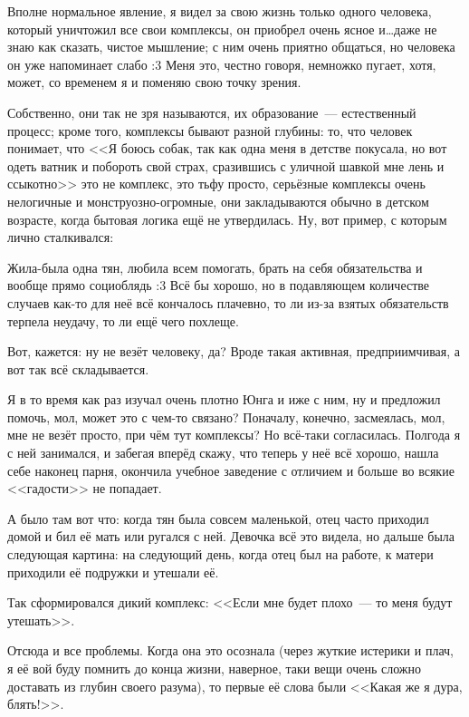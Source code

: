 \documentclass[a5paper,12pt,twoside]{memoir}
\begin{document}
\medskip

Вполне нормальное явление, я видел за свою жизнь только одного человека, который уничтожил все свои комплексы, он приобрел очень ясное и\ldots даже не знаю как сказать, чистое мышление; с ним очень приятно общаться, но человека он уже напоминает слабо :3 Меня это, честно говоря, немножко пугает, хотя, может, со временем я и поменяю свою точку зрения. 

Собственно, они так не зря называются, их образование~--- естественный процесс; кроме того, комплексы бывают разной глубины: то, что человек понимает, что <<Я боюсь собак, так как одна меня в детстве покусала, но вот одеть ватник и побороть свой страх, сразившись с уличной шавкой мне лень и ссыкотно>> это не комплекс, это тьфу просто, серьёзные комплексы очень нелогичные и монструозно-огромные, они закладываются обычно в детском возрасте, когда бытовая логика ещё не утвердилась. Ну, вот пример, с которым лично сталкивался:

Жила-была одна тян, любила всем помогать, брать на себя обязательства и вообще прямо социоблядь :3 Всё бы хорошо, но в подавляющем количестве случаев как-то для неё всё кончалось плачевно, то ли из-за взятых обязательств терпела неудачу, то ли ещё чего похлеще.

Вот, кажется: ну не везёт человеку, да? Вроде такая активная, предприимчивая, а вот так всё складывается.
 
Я в то время как раз изучал очень плотно Юнга и иже с ним, ну и предложил помочь, мол, может это с чем-то связано? Поначалу, конечно, засмеялась, мол, мне не везёт просто, при чём тут комплексы? Но всё-таки согласилась. Полгода я с ней занимался, и забегая вперёд скажу, что теперь у неё всё хорошо, нашла себе наконец парня, окончила учебное заведение с отличием и больше во всякие <<гадости>> не попадает. 

А было там вот что: когда тян была совсем маленькой, отец часто приходил домой и бил её мать или ругался с ней. Девочка всё это видела, но дальше была следующая картина: на следующий день, когда отец был на работе, к матери приходили её подружки и утешали её.
 
Так сформировался дикий комплекс: <<Если мне будет плохо~--- то меня будут утешать>>.
 
Отсюда и все проблемы. Когда она это осознала (через жуткие истерики и плач, я её вой буду помнить до конца жизни, наверное, таки вещи очень сложно доставать из глубин своего разума), то первые её слова были <<Какая же я дура, блять!>>.
 
\end{document}
